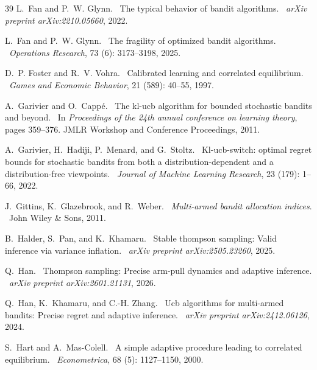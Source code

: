 \documentclass[nonblindrev]{informs3_noinforms}
\def\newblock{\ }%
\begin{document}
\begin{thebibliography}{39}
L.~Fan and P.~W. Glynn.
\newblock The typical behavior of bandit algorithms.
\newblock \emph{arXiv preprint arXiv:2210.05660}, 2022.

L.~Fan and P.~W. Glynn.
\newblock The fragility of optimized bandit algorithms.
\newblock \emph{Operations Research}, 73 (6): 3173--3198, 2025.

D.~P. Foster and R.~V. Vohra.
\newblock Calibrated learning and correlated equilibrium.
\newblock \emph{Games and Economic Behavior}, 21 (589): 40--55, 1997.

A.~Garivier and O.~Capp{\'e}.
\newblock The kl-ucb algorithm for bounded stochastic bandits and beyond.
\newblock In \emph{Proceedings of the 24th annual conference on learning theory}, pages 359--376. JMLR Workshop and Conference Proceedings, 2011.

A.~Garivier, H.~Hadiji, P.~Menard, and G.~Stoltz.
\newblock Kl-ucb-switch: optimal regret bounds for stochastic bandits from both a distribution-dependent and a distribution-free viewpoints.
\newblock \emph{Journal of Machine Learning Research}, 23 (179): 1--66, 2022.

J.~Gittins, K.~Glazebrook, and R.~Weber.
\newblock \emph{Multi-armed bandit allocation indices}.
\newblock John Wiley \& Sons, 2011.

B.~Halder, S.~Pan, and K.~Khamaru.
\newblock Stable thompson sampling: Valid inference via variance inflation.
\newblock \emph{arXiv preprint arXiv:2505.23260}, 2025.

Q.~Han.
\newblock Thompson sampling: Precise arm-pull dynamics and adaptive inference.
\newblock \emph{arXiv preprint arXiv:2601.21131}, 2026.

Q.~Han, K.~Khamaru, and C.-H. Zhang.
\newblock Ucb algorithms for multi-armed bandits: Precise regret and adaptive inference.
\newblock \emph{arXiv preprint arXiv:2412.06126}, 2024.

S.~Hart and A.~Mas-Colell.
\newblock A simple adaptive procedure leading to correlated equilibrium.
\newblock \emph{Econometrica}, 68 (5): 1127--1150, 2000.


\end{thebibliography}
\end{document}
